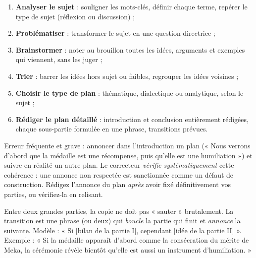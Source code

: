 \documentclass[11pt]{article}
\newcommand{\cle}[1]{{\popxbold\color{popdark}#1}}
\newcounter{popsec}
\newcounter{popsub}
\newcommand{\courssub}[1]{%
  \stepcounter{popsub}%
  \par\vspace{9pt}\noindent{\popxbold\fontsize{11.5}{13}\selectfont\color{popink}{\color{poporange}\thepopsec.\thepopsub}\hspace{6pt}#1}\par\nopagebreak\vspace{4pt}
}
\begin{document}
\begin{methode}
\begin{enumerate}
\item \textbf{Analyser le sujet} : souligner les mots-clés, définir chaque terme, repérer le type de sujet (réflexion ou discussion) ;
\item \textbf{Problématiser} : transformer le sujet en une question directrice ;
\item \textbf{Brainstormer} : noter au brouillon toutes les idées, arguments et exemples qui viennent, sans les juger ;
\item \textbf{Trier} : barrer les idées hors sujet ou faibles, regrouper les idées voisines ;
\item \textbf{Choisir le type de plan} : thématique, dialectique ou analytique, selon le sujet ;
\item \textbf{Rédiger le plan détaillé} : introduction et conclusion entièrement rédigées, chaque sous-partie formulée en une phrase, transitions prévues.
\end{enumerate}
\end{methode}

\begin{attention}
Erreur fréquente et grave : annoncer dans l'introduction un plan (« Nous verrons d'abord que la médaille est une récompense, puis qu'elle est une humiliation ») et suivre en réalité un autre plan. Le correcteur \emph{vérifie systématiquement} cette cohérence : une annonce non respectée est sanctionnée comme un défaut de construction. Rédigez l'annonce du plan \emph{après} avoir fixé définitivement vos parties, ou vérifiez-la en relisant.
\end{attention}

\courssub{Les transitions}

Entre deux grandes parties, la copie ne doit pas « sauter » brutalement. La \cle{transition} est une phrase (ou deux) qui \emph{boucle} la partie qui finit et \emph{annonce} la suivante. Modèle : « Si [bilan de la partie I], cependant [idée de la partie II] ». Exemple : « Si la médaille apparaît d'abord comme la consécration du mérite de Meka, la cérémonie révèle bientôt qu'elle est aussi un instrument d'humiliation. »
\end{document}
